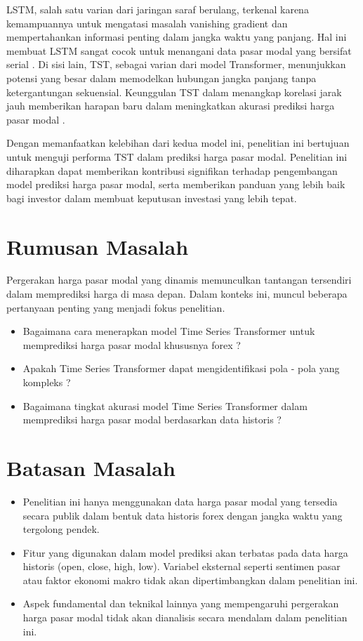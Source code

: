 LSTM, salah satu varian dari jaringan saraf berulang, terkenal karena kemampuannya untuk mengatasi masalah vanishing gradient dan mempertahankan informasi penting dalam jangka waktu yang panjang. Hal ini membuat LSTM sangat cocok untuk menangani data pasar modal yang bersifat serial \autocite{hochreiter1997long}. Di sisi lain, TST, sebagai varian dari model Transformer, menunjukkan potensi yang besar dalam memodelkan hubungan jangka panjang tanpa ketergantungan sekuensial. Keunggulan TST dalam menangkap korelasi jarak jauh memberikan harapan baru dalam meningkatkan akurasi prediksi harga pasar modal \autocite{vaswani2017attention}.

Dengan memanfaatkan kelebihan dari kedua model ini, penelitian ini bertujuan untuk menguji performa TST dalam prediksi harga pasar modal. Penelitian ini diharapkan dapat memberikan kontribusi signifikan terhadap pengembangan model prediksi harga pasar modal, serta memberikan panduan yang lebih baik bagi investor dalam membuat keputusan investasi yang lebih tepat.
\section{Rumusan Masalah}
Pergerakan harga pasar modal yang dinamis memunculkan tantangan tersendiri dalam memprediksi harga di masa depan. Dalam konteks ini, muncul beberapa pertanyaan penting yang menjadi fokus penelitian. 
\begin{itemize}
     \item Bagaimana cara menerapkan model Time Series Transformer untuk memprediksi harga pasar modal khususnya forex ?
     \item Apakah Time Series Transformer dapat mengidentifikasi pola - pola yang kompleks ?
     \item Bagaimana tingkat akurasi model Time Series Transformer dalam memprediksi harga pasar modal berdasarkan data historis ?
\end{itemize}

\section{Batasan Masalah}

\begin{itemize}
    
   \item Penelitian ini hanya menggunakan data harga pasar modal yang tersedia secara publik dalam bentuk data historis forex dengan jangka waktu yang tergolong pendek.

    \item Fitur yang digunakan dalam model prediksi akan terbatas pada data harga historis (open, close, high, low). Variabel eksternal seperti sentimen pasar atau faktor ekonomi makro tidak akan dipertimbangkan dalam penelitian ini.

   \item Aspek fundamental dan teknikal lainnya yang mempengaruhi pergerakan harga pasar modal tidak akan dianalisis secara mendalam dalam penelitian ini.

\end{itemize}

